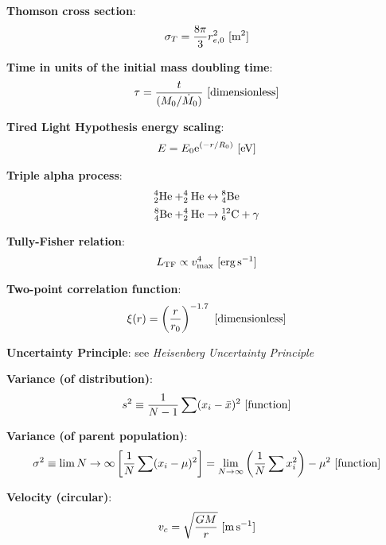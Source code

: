 \documentclass[a4paper,10pt]{article}
\begin{document}
{\noindent}\textbf{Thomson cross section}:
\begin{align*}
\sigma_T = \frac{8\pi}{3}r_{e,0}^2 ~ [{\rm m^2}]
\end{align*}

{\noindent}\textbf{Time in units of the initial mass doubling time}:
\begin{align*}
    \tau = \frac{t}{(M_0/\dot{M}_0)} ~ [{\rm dimensionless}]
\end{align*}

{\noindent}\textbf{Tired Light Hypothesis energy scaling}:
\begin{align*}
    E = E_0 \mathrm{e}^{(-r/R_0)} ~ [{\rm eV}]
\end{align*}

{\noindent}\textbf{Triple alpha process}:
\begin{align*}
    {\rm ^4_2He + ^4_2He} &\leftrightarrow {\rm ^8_4Be} \\
    {\rm ^8_4Be + ^4_2He} &\rightarrow {\rm ^{12}_6C + \gamma}
\end{align*}

{\noindent}\textbf{Tully-Fisher relation}:
\begin{align*}
    L_\mathrm{TF} \propto v_\mathrm{max}^4 ~ [{\rm erg\,s^{-1}}]
\end{align*}

{\noindent}\textbf{Two-point correlation function}:
\begin{align*}
    \xi(r) = \left(\frac{r}{r_0}\right)^{-1.7} ~ [{\rm dimensionless}] 
\end{align*}

{\noindent}\textbf{Uncertainty Principle}: see \textit{Heisenberg Uncertainty Principle}

{\noindent}\textbf{Variance (of distribution)}:
\begin{align*}
    s^2 \equiv \frac{1}{N-1} \sum (x_i-\bar{x})^2 ~ [{\rm function}]
\end{align*}

{\noindent}\textbf{Variance (of parent population)}:
\begin{align*}
    \sigma^2 \equiv \lim{N\rightarrow\infty} \left[\frac{1}{N}\sum(x_i-\mu)^2\right] = \lim_{N\rightarrow\infty} \left(\frac{1}{N}\sum x_i^2\right)-\mu^2 ~ [{\rm function}]
\end{align*}

{\noindent}\textbf{Velocity (circular)}:
\begin{align*}
    v_c = \sqrt{\frac{GM}{r}} ~ [{\rm m\,s^{-1}}]
\end{align*}
\end{document}
